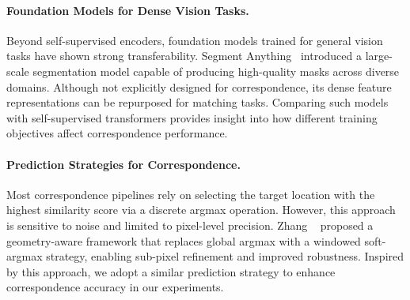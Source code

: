 \paragraph{Foundation Models for Dense Vision Tasks.}
Beyond self-supervised encoders, foundation models trained for general vision tasks have shown strong transferability. Segment Anything~\cite{kirillov2023segment}
introduced a large-scale segmentation model capable of producing high-quality masks across diverse domains. Although not explicitly designed for
correspondence, its dense feature representations can be repurposed for matching tasks. Comparing such models with self-supervised transformers
provides insight into how different training objectives affect correspondence performance.

\paragraph{Prediction Strategies for Correspondence.}
Most correspondence pipelines rely on selecting the target location with the highest similarity score via a discrete argmax operation. However, this
approach is sensitive to noise and limited to pixel-level precision. Zhang \etal~\cite{zhang2024telling} proposed a geometry-aware framework that
replaces global argmax with a windowed soft-argmax strategy, enabling sub-pixel refinement and improved robustness. Inspired by this approach, we adopt
a similar prediction strategy to enhance correspondence accuracy in our experiments.

